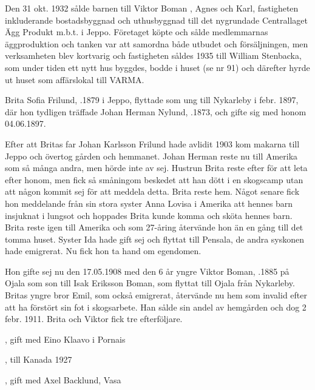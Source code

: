 Den 31 okt. 1932 sålde barnen till Viktor Boman , Agnes och Karl, fastigheten inkluderande bostadsbyggnad och uthusbyggnad till det nygrundade Centrallaget Ägg Produkt m.b.t. i Jeppo. Företaget köpte och sålde medlemmarnas äggproduktion och tanken var att samordna både utbudet och försäljningen, men verksamheten blev kortvarig och fastigheten såldes 1935 till William Stenbacka, som under tiden ett nytt hus byggdes, bodde i huset (se nr 91) och därefter hyrde ut huset som affärslokal till VARMA.


Brita Sofia Frilund, .1879 i Jeppo, flyttade som ung  till Nykarleby i febr. 1897, där hon tydligen träffade Johan Herman Nylund, .1873, och gifte sig med honom 04.06.1897.

Efter att Britas far Johan Karlsson Frilund hade avlidit 1903 kom makarna till Jeppo och övertog gården och hemmanet. Johan Herman reste nu till Amerika som så många andra, men hörde inte av sej. Hustrun Brita reste efter för att leta efter honom, men fick så  småningom beskedet att han dött i en skogscamp utan att någon kommit sej för att meddela detta. Brita reste hem. Något senare fick hon meddelande från sin stora syster Anna Lovisa i Amerika att hennes barn insjuknat i lungsot och hoppades Brita kunde komma och sköta hennes barn. Brita reste igen till Amerika och som 27-åring återvände hon än en gång till det tomma huset. Syster Ida hade gift sej och flyttat till Pensala, de andra syskonen hade emigrerat. Nu fick hon ta hand om egendomen.


Hon gifte sej nu den 17.05.1908 med den 6 år yngre Viktor Boman, .1885 på Ojala som son till Isak Eriksson Boman, som flyttat till Ojala från Nykarleby. Britas yngre bror Emil, som också emigrerat, återvände nu hem som invalid efter att ha förstört sin fot i skogsarbete. Han sålde sin andel av hemgården och dog 2 febr. 1911. Brita och Viktor fick tre efterföljare.
\begin{jhchildren}
  \item {}, gift med Eino Klaavo i Pornais
  \item {}, till Kanada 1927
  \item {}, gift med Axel Backlund, Vasa
\end{jhchildren}

